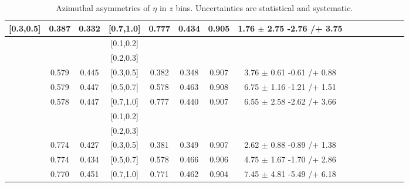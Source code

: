 \begin{table}[H]
\begin{tabular}{|c| c| c| c| c| c| c| c| c| c|c| c| c| c| c|}
[0.3,0.5]	&	0.387	&	0.332	&	[0.7,1.0]	&	0.777	&	0.434	&	0.905	&	1.76	$\pm$	2.75	-2.76	/+	3.75	\\ \hline
[0.5,0.7]	&		&		&	[0.1,0.2]	&		&		&		&							\\ \hline
[0.5,0.7]	&		&		&	[0.2,0.3]	&		&		&		&							\\ \hline
[0.5,0.7]	&	0.579	&	0.445	&	[0.3,0.5]	&	0.382	&	0.348	&	0.907	&	3.76	$\pm$	0.61	-0.61	/+	0.88	\\ \hline
[0.5,0.7]	&	0.579	&	0.447	&	[0.5,0.7]	&	0.578	&	0.463	&	0.908	&	6.75	$\pm$	1.16	-1.21	/+	1.51	\\ \hline
[0.5,0.7]	&	0.578	&	0.447	&	[0.7,1.0]	&	0.777	&	0.440	&	0.907	&	6.55	$\pm$	2.58	-2.62	/+	3.66	\\ \hline
[0.7,1.0]	&		&		&	[0.1,0.2]	&		&		&		&							\\ \hline
[0.7,1.0]	&		&		&	[0.2,0.3]	&		&		&		&							\\ \hline
[0.7,1.0]	&	0.774	&	0.427	&	[0.3,0.5]	&	0.381	&	0.349	&	0.907	&	2.62	$\pm$	0.88	-0.89	/+	1.38	\\ \hline
[0.7,1.0]	&	0.774	&	0.434	&	[0.5,0.7]	&	0.578	&	0.466	&	0.906	&	4.75	$\pm$	1.67	-1.70	/+	2.86	\\ \hline
[0.7,1.0]	&	0.770	&	0.451	&	[0.7,1.0]	&	0.771	&	0.462	&	0.904	&	7.45	$\pm$	4.81	-5.49	/+	6.18	\\ \hline
\end{tabular}
\caption{Azimuthal asymmetries of $\eta$ in $z$ bins. Uncertainties are statistical and systematic.}
\label{tab:finaletazbin}
\end{table}

